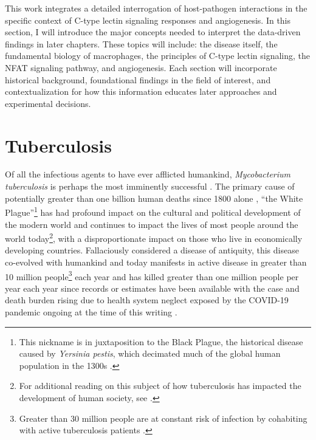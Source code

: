 This work integrates a detailed interrogation of host\hyp{}pathogen interactions in the specific context of C\hyp{}type lectin signaling responses and angiogenesis. In this section, I will introduce the major concepts needed to interpret the data\hyp{}driven findings in later chapters. These topics will include: the disease itself, the fundamental biology of macrophages, the principles of C\hyp{}type lectin signaling, the NFAT signaling pathway, and angiogenesis. Each section will incorporate historical background, foundational findings in the field of interest, and contextualization for how this information educates later approaches and experimental decisions.

\section{Tuberculosis}\label{tuberculosis}

Of all the infectious agents to have ever afflicted humankind, \textit{Mycobacterium tuberculosis} is perhaps the most imminently successful \citep{Barberis2017}. The primary cause of potentially greater than one billion human deaths since 1800 alone \citep{Paulson2013, Murray2004}, ``the White Plague''\footnote{This nickname is in juxtaposition to the Black Plague, the historical disease caused by \textit{Yersinia pestis}, which decimated much of the global human population in the 1300s \citep{Perry1997}.} has had profound impact on the cultural and political development of the modern world and continues to impact the lives of most people around the world today\footnote{For additional reading on this subject of how tuberculosis has impacted the development of human society, see \citep{Chalke1962, Dubos1987}.}, with a disproportionate impact on those who live in economically developing countries. Fallaciously considered a disease of antiquity, this disease co\hyp{}evolved with humankind \citep{Hershkovitz2015} and today manifests in active disease in greater than 10 million people\footnote{Greater than 30 million people are at constant risk of infection by cohabiting with active tuberculosis patients \citep{Ross2021}.} each year and has killed greater than one million people per year each year since records or estimates have been available \citep{WHO2022, Saleem2013} with the case and death burden rising due to health system neglect exposed by the COVID\hyp{}19 pandemic ongoing at the time of this writing \citep{Pai2022}. 

